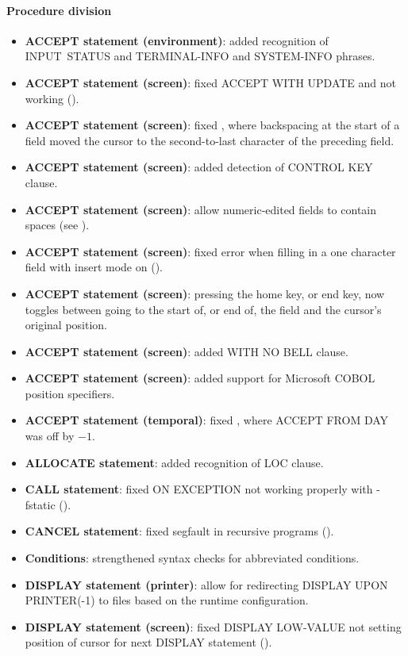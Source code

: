 \paragraph{Procedure division}
\begin{itemize}
\item \textbf{ACCEPT statement (environment)}: added recognition of INPUT~STATUS and TERMINAL-INFO and SYSTEM-INFO phrases. 
\item \textbf{ACCEPT statement (screen)}: fixed ACCEPT WITH UPDATE and not working ().
\item \textbf{ACCEPT statement (screen)}: fixed , where backspacing at the start of a field moved the cursor to the second-to-last character of the preceding field.
\item \textbf{ACCEPT statement (screen)}: added detection of CONTROL KEY clause.
\item \textbf{ACCEPT statement (screen)}: allow numeric-edited fields to contain spaces (see ).
\item \textbf{ACCEPT statement (screen)}: fixed error when filling in a one character field with insert mode on ().
\item \textbf{ACCEPT statement (screen)}: pressing the home key, or end key, now toggles between going to the start of, or end of, the field and the cursor's original position.
\item \textbf{ACCEPT statement (screen)}: added WITH NO BELL clause.
\item \textbf{ACCEPT statement (screen)}: added support for Microsoft COBOL position specifiers.
\item \textbf{ACCEPT statement (temporal)}: fixed , where ACCEPT FROM DAY was off by $-1$.
\item \textbf{ALLOCATE statement}: added recognition of LOC clause.
\item \textbf{CALL statement}: fixed ON EXCEPTION not working properly with -fstatic ().
\item \textbf{CANCEL statement}: fixed segfault in recursive programs ().
\item \textbf{Conditions}: strengthened syntax checks for abbreviated conditions.
\item \textbf{DISPLAY statement (printer)}: allow for redirecting DISPLAY UPON PRINTER(-1) to files based on the runtime configuration.
\item \textbf{DISPLAY statement (screen)}: fixed DISPLAY LOW-VALUE not setting position of cursor for next DISPLAY statement ().

\end{itemize}
